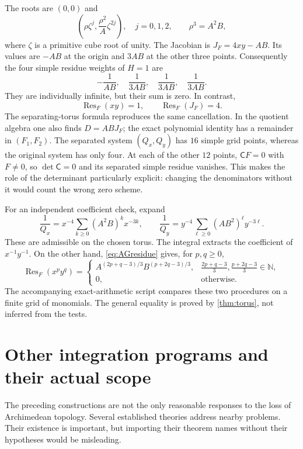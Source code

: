 \documentclass[11pt,letterpaper]{article}
\theoremstyle{definition}
\theoremstyle{remark}
\newcommand{\N}{\mathbb N}
\newcommand{\Res}{\operatorname{Res}}
\numberwithin{equation}{section}
\begin{document}
The roots are $(0,0)$ and
\[
\left(\rho\zeta^j,\frac{\rho^2}{A}\zeta^{2j}\right),
\quad j=0,1,2,\qquad \rho^3=A^2B,
\]
where $\zeta$ is a primitive cube root of unity. The Jacobian is $J_F=4xy-AB$. Its values are $-AB$ at the origin and $3AB$ at the other three points. Consequently the four simple residue weights of $H=1$ are
\[
-\frac1{AB},\quad\frac1{3AB},\quad\frac1{3AB},\quad\frac1{3AB}.
\]
They are individually infinite, but their sum is zero. In contrast,
\begin{equation}\label{eq:examplesres}
\Res_F(xy)=1,\qquad \Res_F(J_F)=4.
\end{equation}
The separating-torus formula reproduces the same cancellation. In the quotient algebra one also finds $D=ABJ_F$; the exact polynomial identity has a remainder in $(F_1,F_2)$.
The separated system $(Q_x,Q_y)$ has $16$ simple grid points, whereas the original system has only four. At each of the other $12$ points, $\mathsf C F=0$ with $F\ne0$, so $\det\mathsf C=0$ and its separated simple residue vanishes. This makes the role of the determinant particularly explicit: changing the denominators without it would count the wrong zero scheme.

For an independent coefficient check, expand
\[
\frac1{Q_x}=x^{-4}\sum_{k\ge0}(A^2B)^k x^{-3k},\qquad
\frac1{Q_y}=y^{-4}\sum_{\ell\ge0}(AB^2)^\ell y^{-3\ell}.
\]
These are admissible on the chosen torus. The integral extracts the coefficient of $x^{-1}y^{-1}$. On the other hand, \eqref{eq:AGresidue} gives, for $p,q\ge0$,
\begin{equation}\label{eq:monomialres}
\Res_F(x^py^q)=
\begin{cases}
A^{(2p+q-3)/3}B^{(p+2q-3)/3},&
\frac{2p+q-3}{3},\frac{p+2q-3}{3}\in\N,\\
0,&\text{otherwise}.
\end{cases}
\end{equation}
The accompanying exact-arithmetic script compares these two procedures on a finite grid of monomials. The general equality is proved by \cref{thm:torus}, not inferred from the tests.

\section{Other integration programs and their actual scope}\label{sec:literature}
The preceding constructions are not the only reasonable responses to the loss of Archimedean topology. Several established theories address nearby problems. Their existence is important, but importing their theorem names without their hypotheses would be misleading.
\end{document}
